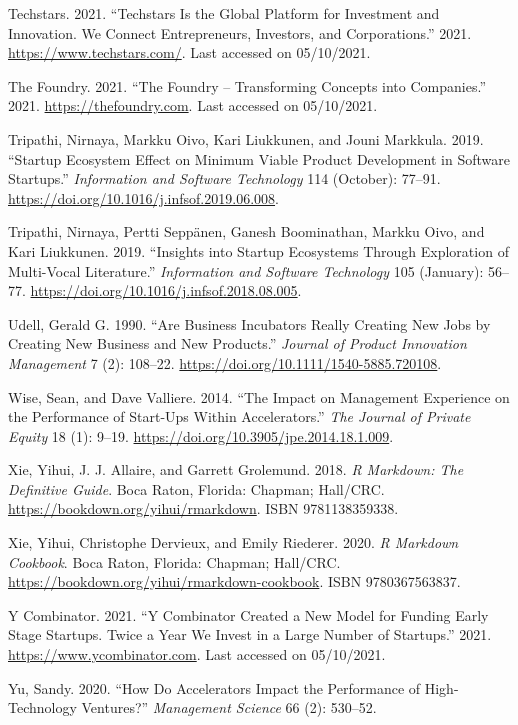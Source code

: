 \documentclass[
  12pt,
]{article}
\newlength{\cslhangindent}
\newlength{\cslentryspacingunit} %
\newenvironment{CSLReferences}[2] %
 {%
  \setlength{\parindent}{0pt}
  \ifodd #1
  \let\oldpar\par
  \def\par{\hangindent=\cslhangindent\oldpar}
  \fi
  \setlength{\parskip}{#2\cslentryspacingunit}
 }%
 {}
\begin{document}
\begin{CSLReferences}{1}{0}
\leavevmode{}%
Techstars. 2021. {``Techstars Is the Global Platform for Investment and Innovation. We Connect Entrepreneurs, Investors, and Corporations.''} 2021. \url{https://www.techstars.com/}. Last accessed on 05/10/2021.

\leavevmode{}%
The Foundry. 2021. {``The Foundry -- Transforming Concepts into Companies.''} 2021. \url{https://thefoundry.com}. Last accessed on 05/10/2021.

\leavevmode{}%
Tripathi, Nirnaya, Markku Oivo, Kari Liukkunen, and Jouni Markkula. 2019. {``Startup Ecosystem Effect on Minimum Viable Product Development in Software Startups.''} \emph{Information and Software Technology} 114 (October): 77--91. \url{https://doi.org/10.1016/j.infsof.2019.06.008}.

\leavevmode{}%
Tripathi, Nirnaya, Pertti Seppänen, Ganesh Boominathan, Markku Oivo, and Kari Liukkunen. 2019. {``Insights into Startup Ecosystems Through Exploration of Multi-Vocal Literature.''} \emph{Information and Software Technology} 105 (January): 56--77. \url{https://doi.org/10.1016/j.infsof.2018.08.005}.

\leavevmode{}%
Udell, Gerald G. 1990. {``Are Business Incubators Really Creating New Jobs by Creating New Business and New Products.''} \emph{Journal of Product Innovation Management} 7 (2): 108--22. \url{https://doi.org/10.1111/1540-5885.720108}.

\leavevmode{}%
Wise, Sean, and Dave Valliere. 2014. {``The Impact on Management Experience on the Performance of Start-Ups Within Accelerators.''} \emph{The Journal of Private Equity} 18 (1): 9--19. \url{https://doi.org/10.3905/jpe.2014.18.1.009}.

\leavevmode{}%
Xie, Yihui, J. J. Allaire, and Garrett Grolemund. 2018. \emph{R Markdown: The Definitive Guide}. Boca Raton, Florida: Chapman; Hall/CRC. \url{https://bookdown.org/yihui/rmarkdown}. ISBN 9781138359338.

\leavevmode{}%
Xie, Yihui, Christophe Dervieux, and Emily Riederer. 2020. \emph{R Markdown Cookbook}. Boca Raton, Florida: Chapman; Hall/CRC. \url{https://bookdown.org/yihui/rmarkdown-cookbook}. ISBN 9780367563837.

\leavevmode{}%
Y Combinator. 2021. {``Y Combinator Created a New Model for Funding Early Stage Startups. Twice a Year We Invest in a Large Number of Startups.''} 2021. \url{https://www.ycombinator.com}. Last accessed on 05/10/2021.

\leavevmode{}%
Yu, Sandy. 2020. {``How Do Accelerators Impact the Performance of High-Technology Ventures?''} \emph{Management Science} 66 (2): 530--52.

\end{CSLReferences}
\end{document}

